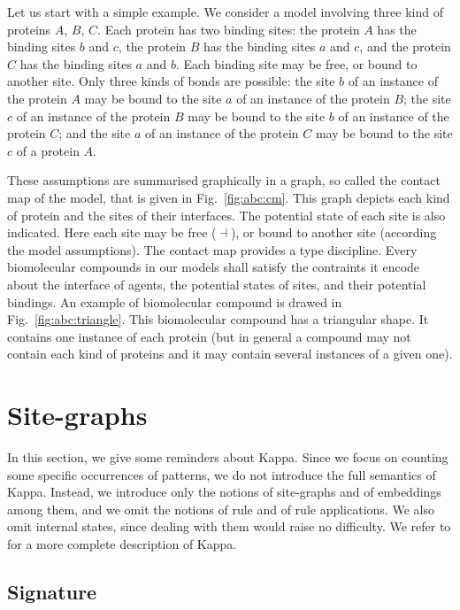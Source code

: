 \documentclass{entcs}
\newcommand{\freesymbol}{\dashv}
\begin{document}
Let us start with a simple example. We consider a model involving three kind of proteins $A$, $B$, $C$. Each protein has two binding sites: the protein $A$ has the binding sites $b$ and $c$, the protein $B$ has the binding sites $a$ and $c$, and the protein $C$ has the binding sites $a$ and $b$. Each binding site may be free, or bound to another site. Only three kinds of bonds are possible: the site $b$ of an instance of the protein $A$ may be bound to the site $a$ of an instance of the protein $B$; the site $c$ of an instance of the  protein $B$ may be bound to the site $b$ of an instance of the protein $C$; and the site $a$ of an instance of the protein $C$ may be bound to the site $c$ of a protein $A$.

These assumptions are summarised graphically in a graph, so called the contact map of the model, that is given in Fig.~\ref{fig:abc:cm}.
This graph depicts each kind of protein and the sites of their interfaces.
The potential state of each site is also indicated. Here each site
may be free ($\freesymbol$), or bound to another site (according the model assumptions). The contact map provides a type discipline.
Every biomolecular compounds in our models shall satisfy the contraints it encode about the interface of agents, the potential states of sites, and their potential bindings. An example of biomolecular compound  is drawed in Fig.~\ref{fig:abc:triangle}. This biomolecular compound has a triangular shape. It contains one instance of each protein (but in general a compound may not contain each kind of proteins and it may contain several instances of a given one).





\section{Site-graphs}

\label{sec:kappa}

In this section, we give some reminders about Kappa.
Since we focus on counting some specific occurrences of patterns, we do not introduce the full semantics of Kappa. Instead, we introduce only the notions of site-graphs and of embeddings among them, and we omit the notions of rule and of rule applications. We also omit internal states, since dealing with them would raise no difficulty.  We refer to
\cite{DBLP:journals/tcs/DanosL04,Feret_IJSI2013} for a more complete description of Kappa.

\subsection{Signature}
\end{document}
